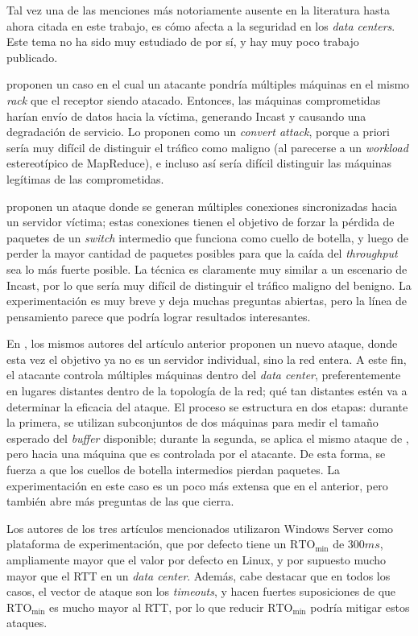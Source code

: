 \documentclass[runningheads,a4paper]{llncs}
\begin{document}
Tal vez una de las menciones más notoriamente ausente en la literatura hasta ahora citada en este trabajo, es cómo afecta a la seguridad en los \textit{data centers}. Este tema no ha sido muy estudiado de por sí, y hay muy poco trabajo publicado.

\citet{Jain_Inside_2015} proponen un caso en el cual un atacante pondría múltiples máquinas en el mismo \textit{rack} que el receptor siendo atacado. Entonces, las máquinas comprometidas harían envío de datos hacia la víctima, generando Incast y causando una degradación de servicio. Lo proponen como un \textit{convert attack}, porque a priori sería muy difícil de distinguir el tráfico como maligno (al parecerse a un \textit{workload} estereotípico de MapReduce), e incluso así sería difícil distinguir las máquinas legítimas de las comprometidas.

\citet{Zhenqian_EPVDCN_2010} proponen un ataque donde se generan múltiples conexiones sincronizadas hacia un servidor víctima; estas conexiones tienen el objetivo de forzar la pérdida de paquetes de un \textit{switch} intermedio que funciona como cuello de botella, y luego de perder la mayor cantidad de paquetes posibles para que la caída del \textit{throughput} sea lo más fuerte posible. La técnica es claramente muy similar a un escenario de Incast, por lo que sería muy difícil de distinguir el tráfico maligno del benigno. La experimentación es muy breve y deja muchas preguntas abiertas, pero la línea de pensamiento parece que podría lograr resultados interesantes.

En \cite{Zhenqian_Shrew_2011}, los mismos autores del artículo anterior proponen un nuevo ataque, donde esta vez el objetivo ya no es un servidor individual, sino la red entera. A este fin, el atacante controla múltiples máquinas dentro del \textit{data center}, preferentemente en lugares distantes dentro de la topología de la red; qué tan distantes estén va a determinar la eficacia del ataque. El proceso se estructura en dos etapas: durante la primera, se utilizan subconjuntos de dos máquinas para medir el tamaño esperado del \textit{buffer} disponible; durante la segunda, se aplica el mismo ataque de \cite{Zhenqian_EPVDCN_2010}, pero hacia una máquina que es controlada por el atacante. De esta forma, se fuerza a que los cuellos de botella intermedios pierdan paquetes. La experimentación en este caso es un poco más extensa que en el anterior, pero también abre más preguntas de las que cierra.

Los autores de los tres artículos mencionados utilizaron Windows Server como plataforma de experimentación, que por defecto tiene un $\text{RTO}_{\text{min}}$ de $300 ms$, ampliamente mayor que el valor por defecto en Linux, y por supuesto mucho mayor que el RTT en un \textit{data center}. Además, cabe destacar que en todos los casos, el vector de ataque son los \textit{timeouts}, y hacen fuertes suposiciones de que $\text{RTO}_{\text{min}}$ es mucho mayor al RTT, por lo que reducir $\text{RTO}_{\text{min}}$ podría mitigar estos ataques.
\end{document}
